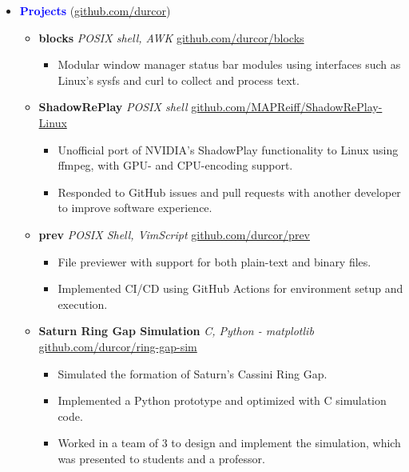 \documentclass[11pt]{article}
\begin{document}
\begin{flushleft}
\begin{itemize}
    \item[] \Large \textcolor{blue}{\textbf{Projects}} (\href{https://github.com/durcor}{github.com/durcor}) \normalsize
        \begin{itemize}
            \item \textbf{blocks} \textit{POSIX shell, AWK} \hfill{\href{https://github.com/durcor/blocks}{github.com/durcor/blocks}}
                \begin{itemize}
                    \item Modular window manager status bar modules using interfaces such as Linux's sysfs and curl to collect and process text.
                \end{itemize}
            \item \textbf{ShadowRePlay} \textit{POSIX shell} \hfill{\href{https://github.com/MAPReiff/ShadowRePlay-Linux}{github.com/MAPReiff/ShadowRePlay-Linux}}
                \begin{itemize}
                    \item Unofficial port of NVIDIA's ShadowPlay functionality to Linux using ffmpeg, with GPU- and CPU-encoding support.
                    \item Responded to GitHub issues and pull requests with another developer to improve software experience.
                \end{itemize}
            \item \textbf{prev} \textit{POSIX Shell, VimScript} \hfill{\href{https://github.com/durcor/prev}{github.com/durcor/prev}}
                \begin{itemize}
                    \item File previewer with support for both plain-text and binary files.
                    \item Implemented CI/CD using GitHub Actions for environment setup and execution.
                \end{itemize}
            \item \textbf{Saturn Ring Gap Simulation} \textit{C, Python - matplotlib} \hfill{\href{https://github.com/durcor/ring-gap-sim}{github.com/durcor/ring-gap-sim}}
                \begin{itemize}
                    \item Simulated the formation of Saturn's Cassini Ring Gap.
                    \item Implemented a Python prototype and optimized with C simulation code.
                    \item Worked in a team of 3 to design and implement the simulation, which was presented to students and a professor.

\end{itemize}
\end{itemize}
\end{itemize}
\end{flushleft}
\end{document}
